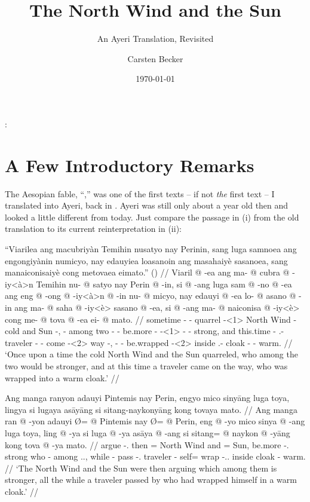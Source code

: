 \documentclass[12pt,paper=a4]{scrartcl}
\author{Carsten Becker}
\title{The North Wind and the Sun}
\subtitle{An Ayeri Translation, Revisited}
\date{\today} %
\newenvironment{mytitle}{
    \hfill
    \begin{minipage}{0.667\textwidth}
	\vspace{\baselineskip}
	\begin{center}
	    \Large
	    \sffamily\bfseries
	    \makeatletter
}{
	    \makeatother
	\end{center}
	\vspace{1em}
    \end{minipage}
    \hfill
}
\begin{document}

\begin{mytitle}
    \@title:\\
    \@subtitle
\end{mytitle}

\section{A Few Introductory Remarks}

The Aesopian fable, \enquote{,} was one of the first texts -- if not \emph{the} first text -- I translated into Ayeri, back in \citeyear{becker2004}. Ayeri was still only about a year old then and looked a little different from today. Just compare the passage in (i) from the old translation to its current reinterpretation in (ii):

\ex[exno=i, belowexskip=0em]
\begingl
	\glpreamble \enquote{Viarilea ang macubriyàn Temihin nusatyo nay Perinin, sang luga samnoea ang engongiyànin numicyo, nay edauyiea loasanoin ang masahaiyè sasanoea, sang manaiconisaiyè cong metovaea eimato.} (\cite[1]{becker2004}) //
	\gla Viaril @ -ea ang ma- @ cubra @ -iy<à>n Temihin nu- @ satyo nay Perin @ -in, si @ -ang luga sam @ -no @ -ea ang eng @ -ong @ -iy<à>n @ -in nu- @ micyo, nay edauyi @ -ea lo- @ asano @ -in ang ma- @ saha @ -iy<è> sasano @ -ea, si @ -ang ma- @ naiconisa @ -iy<è> cong me- @ tova @ -ea ei- @ mato. //
	\glb sometime -\Loc{} \AgtT{} \Pst{}- quarrel - {North Wind} \Aarg{}- cold and Sun -\Top{}, \Rel{} -\Aarg{} among two -\Nmlz{} -\Loc{} \AgtT{} be.more -\Irr{} - -\Top{} \Aarg{}- strong, and this.time -\Loc{} \Indf{}.\Aarg{}- traveler -\Top{} \AgtT{} \Pst{}- come - way -\Loc{}, \Rel{} -\Aarg{} \Pst{}- be.wrapped - inside \Indf{}.\Parg{}- cloak -\Loc{} \Obl{}- warm. //
	\glft `Once upon a time the cold North Wind and the Sun quarreled, who among the two would be stronger, and at this time a traveler came on the way, who was wrapped into a warm cloak.' //
\endgl\xe

\ex[exno=ii]
\begingl
	\glpreamble Ang manga ranyon adauyi Pintemis nay Perin, engyo mico sinyāng luga toya, lingya si lugaya asāyāng si sitang-naykonyāng kong tovaya mato. //
	\gla Ang manga ran @ -yon adauyi Ø= @ Pintemis nay Ø= @ Perin, eng @ -yo mico sinya @ -ang luga toya, ling @ -ya si luga @ -ya asāya @ -ang si sitang= @ naykon @ -yāng kong tova @ -ya mato. //
	\glb \AgtT{} \Prog{} argue -\Tpl{}.\N{} then \Top{}= {North Wind} and \Top{}= Sun, be.more -\Tsg{}.\N{} strong who -\Aarg{} among \Tpl{}.\N{}.\Loc{}, while -\Loc{} \Rel{} pass -\Tsg{}.\M{} traveler -\Aarg{} \Rel{} self= wrap -\Tsg{}.\M{}.\Aarg{} inside cloak -\Loc{} warm. //
	\glft `The North Wind and the Sun were then arguing which among them is stronger, all the while a traveler passed by who had wrapped himself in a warm cloak.' //
\endgl
\xe
\end{document}
